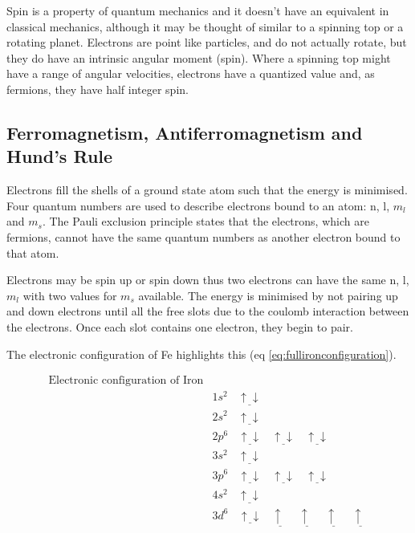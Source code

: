 Spin is a property of quantum mechanics and it doesn't have an equivalent in classical mechanics, although it may be thought of similar to a spinning top or a rotating planet.  Electrons are point like particles, and do not actually rotate, but they do have an intrinsic angular moment (spin).  Where a spinning top might have a range of angular velocities, electrons have a quantized value and, as fermions, they have half integer spin.  


\subsection{Ferromagnetism, Antiferromagnetism and Hund's Rule}
\label{section:hundsrule}

Electrons fill the shells of a ground state atom such that the energy is minimised.  Four quantum numbers are used to describe electrons bound to an atom: n, l, $m_l$ and $m_s$.  The Pauli exclusion principle states that the electrons, which are fermions, cannot have the same quantum numbers as another electron bound to that atom.

Electrons may be spin up or spin down thus two electrons can have the same n, l, $m_l$ with two values for $m_s$ available.  The energy is minimised by not pairing up and down electrons until all the free slots due to the coulomb interaction between the electrons.  Once each slot contains one electron, they begin to pair.

The electronic configuration of \Gls{Fe} highlights this (eq \ref{eq:fullironconfiguration}).


\begin{equation}
\begin{split}
\text{Electronic configuration of Iron}\\
&1s^2 \:\:\:\: \underline{\uparrow \downarrow} \\
&2s^2 \:\:\:\: \underline{\uparrow \downarrow} \\
&2p^6 \:\:\:\: \underline{\uparrow \downarrow} \:\:\:\:  \underline{\uparrow  \downarrow} \:\:\:\:  \underline{\uparrow  \downarrow} \\
&3s^2 \:\:\:\: \underline{\uparrow \downarrow} \\
&3p^6 \:\:\:\: \underline{\uparrow \downarrow} \:\:\:\:  \underline{\uparrow \downarrow} \:\:\:\:  \underline{\uparrow \downarrow} \\
&4s^2 \:\:\:\: \underline{\uparrow \downarrow} \\
&3d^6 \:\:\:\: \underline{\uparrow \downarrow} \:\:\:\:  \underline{\uparrow \:\:} \:\:\:\:  \underline{\uparrow \:\:} \:\:\:\: \underline{\uparrow \:\:} \:\:\:\: \underline{\uparrow \:\:}\\
\end{split}
\label{eq:fullironconfiguration}
\end{equation}

